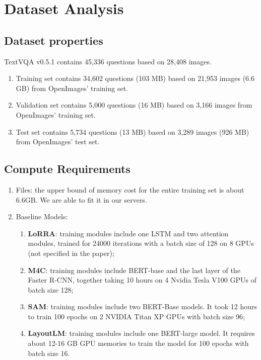 \documentclass[11pt,a4paper]{article}
\begin{document}
\section{Dataset Analysis}
\subsection{Dataset properties}

TextVQA v0.5.1 contains 45,336 questions based on 28,408 images. 
\begin{enumerate}
	\item Training set contains 34,602 questions (103 MB) based on 21,953 images (6.6 GB) from OpenImages' training set. 
	\item Validation set contains 5,000 questions (16 MB) based on 3,166 images from OpenImages' training set. 
	\item Test set contains 5,734 questions (13 MB) based on 3,289 images (926 MB) from OpenImages' test set.

\end{enumerate}

\subsection{Compute Requirements}
  \begin{enumerate}
    \item Files: the upper bound of memory cost for the entire training set is about 6.6GB. We are able to fit it in our servers. 
    \item Baseline Models:
    \begin{enumerate}
        \item \textbf{LoRRA}: training modules include one LSTM and two attention modules, trained for 24000 iterations with a batch size of 128 on 8 GPUs (not specified in the paper);
        \item \textbf{M4C}: training modules include BERT-base and the last layer of the Faster R-CNN, together taking 10 hours on 4 Nvidia Tesla V100 GPUs of batch size 128;
        \item \textbf{SAM}: training modules include two BERT-Base models. It took 12 hours to train 100 epochs on 2 NVIDIA Titan XP GPUs with batch size 96; 
        \item \textbf{LayoutLM}: training modules include one BERT-large model. It requires about 12-16 GB GPU memories to train the model for 100 epochs with batch size 16.
    \end{enumerate}
  \end{enumerate}
  
\end{document}
